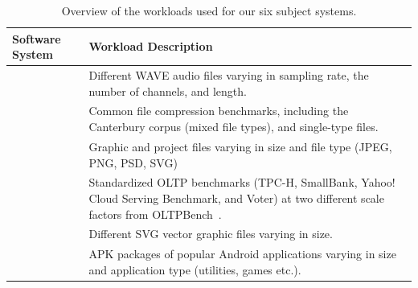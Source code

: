 \begin{table}
	\footnotesize
	\centering
	\caption{Overview of the workloads used for our six subject systems.}
	\begin{tabular}{lp{6cm}}
		\toprule
		\textbf{Software System} & \textbf{Workload Description} \\
		\midrule
		
		\jumper & Different WAVE audio files varying in sampling rate, the number of channels, and length. \\
		
		\midrule
		\kanzi  & Common file compression benchmarks, including the Canterbury corpus (mixed file types), and single-type files. \\
		
		\midrule
		\dconvert  & Graphic and project files varying in size and file type (JPEG, PNG, PSD, SVG) \\
		
		\midrule
		\htwo & Standardized OLTP benchmarks (TPC-H, SmallBank, Yahoo! Cloud Serving Benchmark, and Voter) at two different scale factors from \textsf{OLTPBench}~\cite{difallah_oltp_2013}. \\
		
		\midrule
		\batik  & Different SVG vector graphic files varying in size. \\
		
		\midrule
		\jadx  & APK packages of popular Android applications varying in size and application type (utilities, games etc.). \\
		\bottomrule
	\end{tabular}
\label{tab:workloads}
\end{table}

